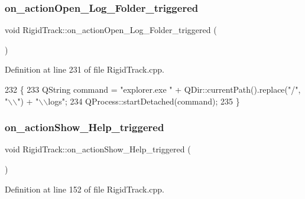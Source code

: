 \subsubsection{\texorpdfstring{on\+\_\+action\+Open\+\_\+\+Log\+\_\+\+Folder\+\_\+triggered}{on\_actionOpen\_Log\_Folder\_triggered}}
{\footnotesize\ttfamily void Rigid\+Track\+::on\+\_\+action\+Open\+\_\+\+Log\+\_\+\+Folder\+\_\+triggered (\begin{DoxyParamCaption}{ }\end{DoxyParamCaption})\hspace{0.3cm}{\ttfamily [slot]}}



Definition at line 231 of file Rigid\+Track.\+cpp.


\begin{DoxyCode}
232 \{
233     QString command = \textcolor{stringliteral}{"explorer.exe "} + QDir::currentPath().replace(\textcolor{stringliteral}{"/"}, \textcolor{stringliteral}{"\(\backslash\)\(\backslash\)"}) + \textcolor{stringliteral}{"\(\backslash\)\(\backslash\)logs"};
234     QProcess::startDetached(command);
235 \}
\end{DoxyCode}
\mbox{\label{class_rigid_track_af14465ac3ad6957b939c63cbae2d7d8c}} 
\subsubsection{\texorpdfstring{on\+\_\+action\+Show\+\_\+\+Help\+\_\+triggered}{on\_actionShow\_Help\_triggered}}
{\footnotesize\ttfamily void Rigid\+Track\+::on\+\_\+action\+Show\+\_\+\+Help\+\_\+triggered (\begin{DoxyParamCaption}{ }\end{DoxyParamCaption})\hspace{0.3cm}{\ttfamily [slot]}}



Definition at line 152 of file Rigid\+Track.\+cpp.


